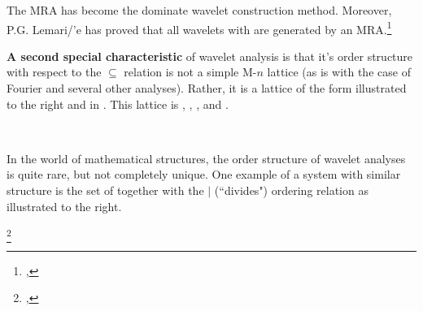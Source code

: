 The MRA has become the dominate wavelet construction method.
Moreover, P.G. Lemari/'e has proved that all wavelets with  are generated by an MRA.\footnote{
  ,
  }

\begin{minipage}{\tw-65mm}%
  \textbf{A second special characteristic} of wavelet analysis is that it's order structure
  with respect to the $\subseteq$ relation is not a simple M-$n$ lattice 
 (as is with the case of Fourier and several other analyses).
  Rather, it is a lattice of the form illustrated to the right and in .
  This lattice is , ,
  , and  .\footnotemark
\end{minipage}%
\hfill%


\mbox{}\\
\begin{minipage}{\tw-65mm}%
  In the world of mathematical structures,
  the order structure of wavelet analyses is quite rare, but not completely unique.
  One example of a system with similar structure is the set of 
  together with the $|$ (``divides") ordering relation\footnotemark
  as illustrated to the right. %
\end{minipage}%
\footnote{%
  ,
  }%
\hfill%
%

